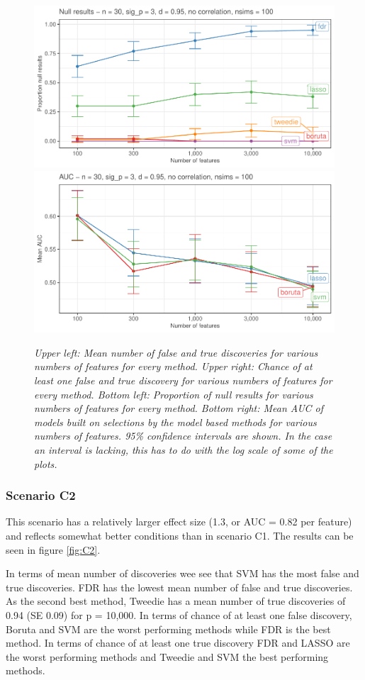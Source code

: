 \documentclass[
]{article}
\begin{document}
\begin{figure}

{\centering \includegraphics[width=0.49\linewidth]{main_files/figure-latex/C1-1} \includegraphics[width=0.49\linewidth]{main_files/figure-latex/C1-2} 

}

\caption{\textit{Upper left: Mean number of false and true discoveries for various numbers of features for every method. Upper right: Chance of at least one false and true discovery for various numbers of features for every method. Bottom left: Proportion of null results for various numbers of features for every method. Bottom right: Mean AUC of models built on selections by the model based methods for various numbers of features. 95\% confidence intervals are shown. In the case an interval is lacking, this has to do with the log scale of some of the plots.}}\label{fig:C1}
\end{figure}

\hypertarget{scenario-c2}{%
\subsubsection{Scenario C2}\label{scenario-c2}}

This scenario has a relatively larger effect size (1.3, or AUC = 0.82 per feature) and reflects somewhat better conditions than in scenario C1. The results can be seen in figure \ref{fig:C2}.

In terms of mean number of discoveries wee see that SVM has the most false and true discoveries. FDR has the lowest mean number of false and true discoveries. As the second best method, Tweedie has a mean number of true discoveries of 0.94 (SE 0.09) for p = 10,000. In terms of chance of at least one false discovery, Boruta and SVM are the worst performing methods while FDR is the best method. In terms of chance of at least one true discovery FDR and LASSO are the worst performing methods and Tweedie and SVM the best performing methods.
\end{document}
